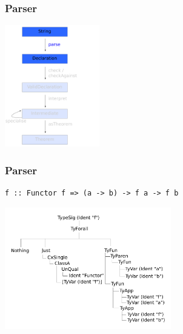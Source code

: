 \documentclass{beamer}
\begin{document}

\begin{frame}
\frametitle{Parser}
\begin{center}
\includegraphics[height=200px]{overview-free-theorems-parse}
\end{center}
\end{frame}


\begin{frame}[fragile]
\frametitle{Parser}
\begin{verbatim}
f :: Functor f => (a -> b) -> f a -> f b
\end{verbatim}

\begin{center}
\includegraphics[height=200px]{ast-orig}
\end{center}
\end{frame}

\end{document}
